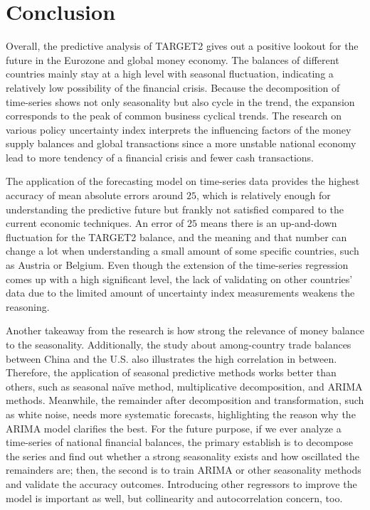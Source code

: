 \documentclass[12pt]{article}
\begin{document}
\section{Conclusion} \label{sec:conclusion}
Overall, the predictive analysis of TARGET2 gives out a positive lookout for the future in the Eurozone and global money economy. The balances of different countries mainly stay at a high level with seasonal fluctuation, indicating a relatively low possibility of the financial crisis. Because the decomposition of time-series shows not only seasonality but also cycle in the trend, the expansion corresponds to the peak of common business cyclical trends. The research on various policy uncertainty index interprets the influencing factors of the money supply balances and global transactions since a more unstable national economy lead to more tendency of a financial crisis and fewer cash transactions. 

The application of the forecasting model on time-series data provides the highest accuracy of mean absolute errors around $25$, which is relatively enough for understanding the predictive future but frankly not satisfied compared to the current economic techniques. An error of $25$ means there is an up-and-down fluctuation for the TARGET2 balance, and the meaning and that number can change a lot when understanding a small amount of some specific countries, such as Austria or Belgium. Even though the extension of the time-series regression comes up with a high significant level, the lack of validating on other countries' data due to the limited amount of uncertainty index measurements weakens the reasoning. 

Another takeaway from the research is how strong the relevance of money balance to the seasonality. Additionally, the study about among-country trade balances between China and the U.S. also illustrates the high correlation in between. Therefore, the application of seasonal predictive methods works better than others, such as seasonal naïve method, multiplicative decomposition, and ARIMA methods. Meanwhile, the remainder after decomposition and transformation, such as white noise, needs more systematic forecasts, highlighting the reason why the ARIMA model clarifies the best. For the future purpose, if we ever analyze a time-series of national financial balances, the primary establish is to decompose the series and find out whether a strong seasonality exists and how oscillated the remainders are; then, the second is to train ARIMA or other seasonality methods and validate the accuracy outcomes. Introducing other regressors to improve the model is important as well, but collinearity and autocorrelation concern, too. 
\end{document}
